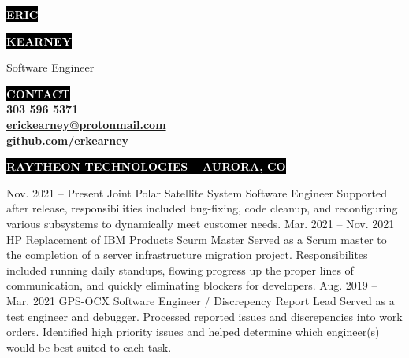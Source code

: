 \documentclass[8pt]{resumeclass}
\begin{document}

\begin{minipage}[t]{0.65\textwidth}							%
	\vspace{-\baselineskip}								%

	\colorbox{black}{\huge\textcolor{white}{\textbf{\MakeUppercase{Eric}}}}

	\colorbox{black}{\huge\textcolor{white}{\textbf{\MakeUppercase{Kearney}}}}
	
	\vspace{6pt}

	{\huge Software Engineer}
\end{minipage}
\begin{minipage}[t]{0.35\textwidth}							%
	\vspace{-\baselineskip}
	\vspace{15pt}
	\colorbox{black}{\textcolor{white}{\textbf{\MakeUppercase{Contact}}}}\\
	{\textbf{303 596 5371}}\\
	{\href{mailto:erickearney@protonmail.com}{\textbf{erickearney@protonmail.com}}}\\
	{\href{https://github.com/erkearney}{\textbf{github.com/erkearney}}}\\
\end{minipage}

\vspace{3pt}


\colorbox{black}{\small\textcolor{white}{\textbf{\MakeUppercase{Raytheon Technologies -- Aurora, CO}}}}
\vspace{6pt}

\begin{entrylist}
	\entry
		{Nov. 2021 -- Present}
		{Joint Polar Satellite System}
		{Software Engineer}
		{Supported after release, responsibilities included bug-fixing, code cleanup, and reconfiguring various subsystems to dynamically meet customer needs.}
	\entry
		{Mar. 2021 -- Nov. 2021}
		{HP Replacement of IBM Products}
		{Scurm Master}
		{Served as a Scrum master to the completion of a server infrastructure migration project. Responsibilites included running daily standups, flowing progress up the proper lines of communication, and quickly eliminating blockers for developers.}
	\entry
		{Aug. 2019 -- Mar. 2021}
		{GPS-OCX}
		{Software Engineer / Discrepency Report Lead}
		{Served as a test engineer and debugger. Processed reported issues and discrepencies into work orders. Identified high priority issues and helped determine which engineer(s) would be best suited to each task.}
\end{entrylist}
\end{document}
